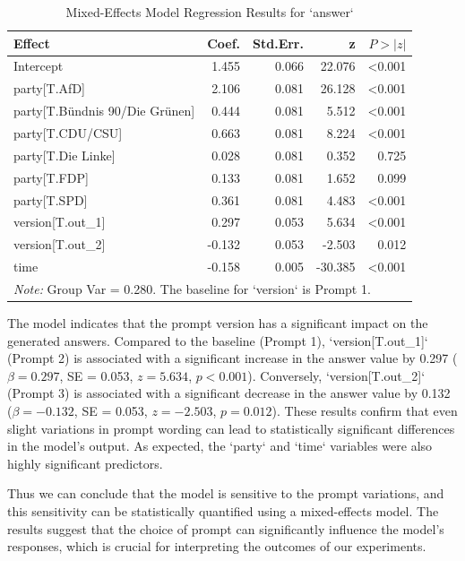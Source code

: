 \documentclass[12pt]{article}
\begin{document}
\begin{table}[h!]
\centering
\caption{Mixed-Effects Model Regression Results for `answer`}
\label{tab:mixed_model_results}
\begin{tabular}{lrrrr}
\hline
\textbf{Effect} & \textbf{Coef.} & \textbf{Std.Err.} & \textbf{z} & \textbf{$P>|z|$} \\
\hline
Intercept                       & 1.455    & 0.066  & 22.076 & \textless 0.001 \\
party[T.AfD]                    & 2.106    & 0.081  & 26.128 & \textless 0.001 \\
party[T.Bündnis 90/Die Grünen]  & 0.444    & 0.081  & 5.512  & \textless 0.001 \\
party[T.CDU/CSU]                & 0.663    & 0.081  & 8.224  & \textless 0.001 \\
party[T.Die Linke]              & 0.028    & 0.081  & 0.352  & 0.725 \\
party[T.FDP]                    & 0.133    & 0.081  & 1.652  & 0.099 \\
party[T.SPD]                    & 0.361    & 0.081  & 4.483  & \textless 0.001 \\
version[T.out\_1]                & 0.297    & 0.053  & 5.634  & \textless 0.001 \\
version[T.out\_2]               & -0.132   & 0.053  & -2.503 & 0.012 \\
time                            & -0.158   & 0.005  & -30.385& \textless 0.001 \\
\hline
\multicolumn{5}{l}{\textit{Note:} Group Var = 0.280. The baseline for `version` is Prompt 1.}
\end{tabular}
\end{table}

The model indicates that the prompt version has a significant impact on the generated answers. Compared to the baseline (Prompt 1), `version[T.out\_1]` (Prompt 2) is associated with a significant increase in the answer value by 0.297 ($\beta = 0.297$, SE = 0.053, $z = 5.634$, $p < 0.001$). Conversely, `version[T.out\_2]` (Prompt 3) is associated with a significant decrease in the answer value by 0.132 ($\beta = -0.132$, SE = 0.053, $z = -2.503$, $p = 0.012$). These results confirm that even slight variations in prompt wording can lead to statistically significant differences in the model's output. As expected, the `party` and `time` variables were also highly significant predictors.

Thus we can conclude that the model is sensitive to the prompt variations, and this sensitivity can be statistically quantified using a mixed-effects model. The results suggest that the choice of prompt can significantly influence the model's responses, which is crucial for interpreting the outcomes of our experiments.
\end{document}
